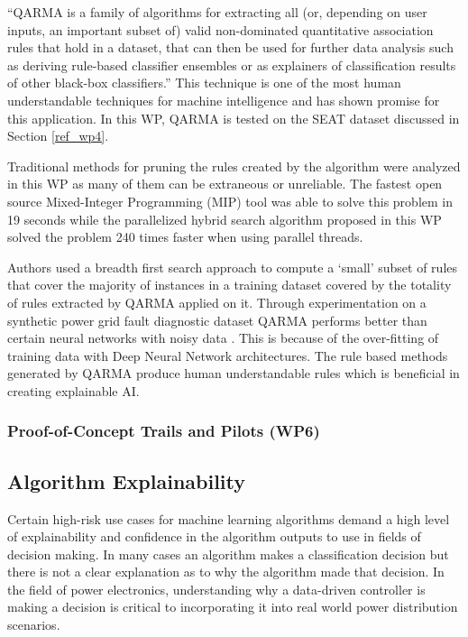 \enquote{QARMA is a family of algorithms for extracting all (or, depending on user inputs, an important subset of) valid non-dominated quantitative association rules that hold in a dataset, that can then be used for further data analysis such as deriving rule-based classifier ensembles or as explainers of classification results of other black-box classifiers.}  This technique is one of the most human understandable techniques for machine intelligence and has shown promise for this application. In this WP, QARMA is tested on the SEAT dataset discussed in Section \ref{ref_wp4}.

Traditional methods for pruning the rules created by the algorithm were analyzed in this WP as many of them can be extraneous or unreliable. The fastest open source Mixed-Integer Programming (MIP) tool was able to solve this problem in 19 seconds while the parallelized hybrid search algorithm proposed in this WP solved the problem 240 times faster when using parallel threads.

Authors \cite{wp5.1} used a breadth first search approach to compute a `small' subset of rules that cover the majority of instances in a training dataset covered by the totality of rules extracted by QARMA applied on it. Through experimentation on a synthetic power grid fault diagnostic dataset QARMA performs better than certain neural networks with noisy data \parencite{ml-performance-power-trans}. This is because of the over-fitting of training data with Deep Neural Network architectures. The rule based methods generated by QARMA produce human understandable rules which is beneficial in creating explainable AI.

\subsubsection{Proof-of-Concept Trails and Pilots (WP6)}
\label{ref_wp6}


\subsection{Algorithm Explainability}

Certain high-risk use cases for machine learning algorithms demand a high level of explainability and confidence in the algorithm outputs to use in fields of decision making. In many cases an algorithm makes a classification decision but there is not a clear explanation as to why the algorithm made that decision. In the field of power electronics, understanding why a data-driven controller is making a decision is critical to incorporating it into real world power distribution scenarios. 

